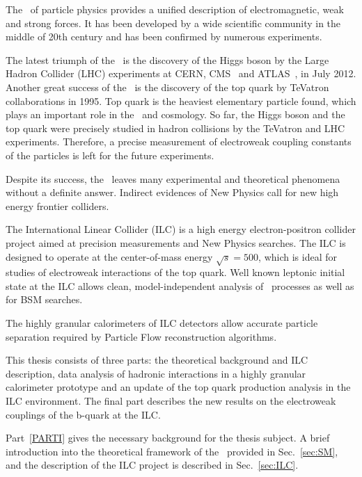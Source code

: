 
The \sm\ of particle physics provides a unified description of electromagnetic, weak and strong forces. It has been developed by a wide scientific community in the middle of 20th century and has been confirmed by numerous experiments. 

The latest triumph of the \sm\ is the discovery of the Higgs boson by the Large Hadron Collider (LHC) experiments at CERN, CMS~\cite{bib:HiggsCms} and ATLAS~\cite{bib:HiggsAtlas}, in July 2012.
Another great success of the \sm\ is the discovery of the top quark by TeVatron collaborations in 1995. Top quark is the heaviest elementary particle found, which plays an important role in the \sm\ and cosmology. 
So far, the Higgs boson and the top quark were precisely studied in hadron collisions by the TeVatron and LHC experiments. Therefore, a precise measurement of electroweak coupling constants of the particles is left for the future experiments.

Despite its success, the \sm\ leaves many experimental and theoretical phenomena without a definite answer. 
Indirect evidences of New Physics call for new high energy frontier colliders.

The International Linear Collider \cite{bib:ILC} (ILC) is a high energy electron-positron collider project aimed at precision measurements and New Physics searches. 
The ILC is designed to operate at the center-of-mass energy $\sqrt{s}=500$\gev, which is ideal for studies of electroweak interactions of the top quark. 
Well known leptonic initial state at the ILC allows clean, model-independent analysis of \sm\ processes as well as for BSM searches. 

The highly granular calorimeters of ILC detectors allow accurate particle separation required by Particle Flow reconstruction algorithms.

This thesis consists of three parts: the theoretical background and ILC description, data analysis of hadronic interactions in a highly granular calorimeter prototype and an update of the top quark production analysis in the ILC environment.
The final part describes the new results on the electroweak couplings of the b-quark at the ILC.

Part~\ref{PARTI} gives the necessary background for the thesis subject. A brief introduction into the theoretical framework of the \sm\ provided in Sec.~\ref{sec:SM}, and the description of the ILC project is described in Sec.~\ref{sec:ILC}.

